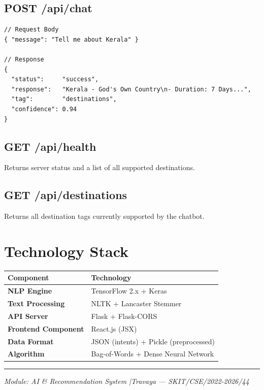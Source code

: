 \documentclass[12pt,a4paper]{article}
\begin{document}
\subsection{POST /api/chat}

\begin{lstlisting}[caption={Request and Response --- /api/chat}]
// Request Body
{ "message": "Tell me about Kerala" }

// Response
{
  "status":     "success",
  "response":   "Kerala - God's Own Country\n- Duration: 7 Days...",
  "tag":        "destinations",
  "confidence": 0.94
}
\end{lstlisting}

\subsection{GET /api/health}

Returns server status and a list of all supported destinations.

\subsection{GET /api/destinations}

Returns all destination tags currently supported by the chatbot.

\section{Technology Stack}

\begin{center}
\begin{tabular}{>{\bfseries}p{4.5cm} p{8cm}}
\toprule
\textbf{Component} & \textbf{Technology} \\
\midrule
NLP Engine        & TensorFlow 2.x + Keras \\
Text Processing   & NLTK + Lancaster Stemmer \\
API Server        & Flask + Flask-CORS \\
Frontend Component & React.js (JSX) \\
Data Format       & JSON (intents) + Pickle (preprocessed) \\
Algorithm         & Bag-of-Words + Dense Neural Network \\
\bottomrule
\end{tabular}
\end{center}

\vspace{12pt}
\noindent\rule{\textwidth}{0.5pt}
\vspace{4pt}

\begin{center}
\small\textit{Module: AI \& Recommendation System \quad|\quad Travaya --- SKIT/CSE/2022-2026/44}
\end{center}
\end{document}
